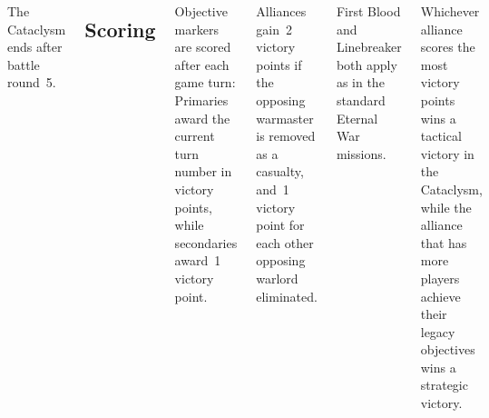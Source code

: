 \begin{columns}
  The Cataclysm ends after battle round~5.

  \subsection{Scoring}

  Objective markers are scored after each game turn: Primaries award
  the current turn number in victory points, while secondaries award~1
  victory point.


  Alliances gain~2 victory points if the opposing warmaster is removed
  as a casualty, and~1 victory point for each other opposing warlord
  eliminated.

  First Blood and Linebreaker both apply as in the standard Eternal
  War missions.


  Whichever alliance scores the most victory points wins a tactical
  victory in the Cataclysm, while the alliance that has more players
  achieve their legacy objectives wins a strategic victory.

\end{columns}
